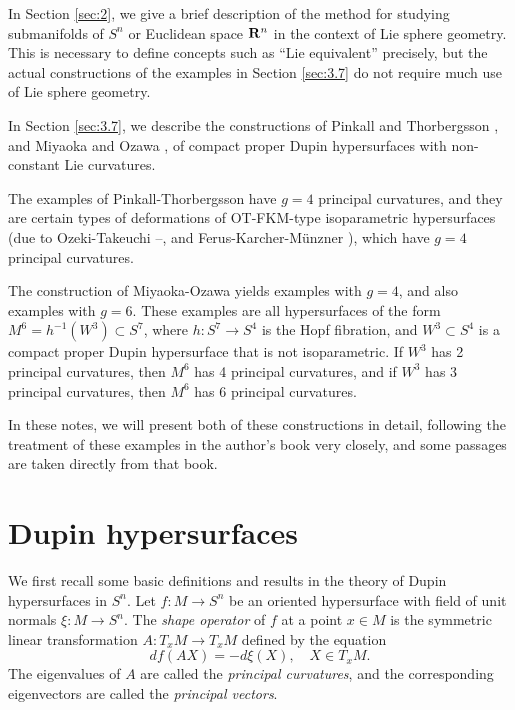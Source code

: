 \documentclass[12pt]{article}
\begin{document}
In Section \ref{sec:2}, we give a brief description of the method for studying submanifolds of $S^n$ or Euclidean space
${\bf R}^n$ in the context of Lie sphere geometry.  This is necessary to define concepts such as ``Lie equivalent'' precisely, but the actual constructions of the examples in Section \ref{sec:3.7} do not require much use of Lie sphere geometry.

In Section \ref{sec:3.7}, we describe the constructions of Pinkall and Thorbergsson \cite{PT1}, and  Miyaoka and
Ozawa \cite{MO}, of compact proper Dupin hypersurfaces with non-constant Lie curvatures.  

The examples of 
Pinkall-Thorbergsson have $g=4$ principal curvatures, and they 
are certain types of deformations of OT-FKM-type isoparametric hypersurfaces (due to Ozeki-Takeuchi 
\cite{OT}--\cite{OT2}, and
Ferus-Karcher-M\"{u}nzner  \cite{FKM}), which have $g=4$ principal curvatures.  

The construction of Miyaoka-Ozawa yields examples with $g=4$, and also examples with $g=6$.
These examples are all hypersurfaces of the form $M^6 = h^{-1}(W^3) \subset S^7$,
where $h:S^7 \rightarrow S^4$ is the Hopf fibration, and $W^3 \subset S^4$
is a compact proper Dupin hypersurface that is not isoparametric.  If $W^3$ has 2 principal curvatures, then $M^6$ has 4 principal curvatures, and if $W^3$ has 3 principal curvatures, then $M^6$ has 6 principal curvatures.


In these notes, we will present both of these constructions in detail, following the treatment of these examples in the author's book \cite[pp. 112--123]{Cec1} very closely, and some passages are taken directly from that book.


\section{Dupin hypersurfaces}
\label{sec:1}
We first recall some basic definitions and results in the theory of Dupin hypersurfaces in $S^n$.
Let $f:M \rightarrow S^n$ be an oriented hypersurface with field of unit normals $\xi:M \rightarrow S^n$.  The 
{\em shape operator}
of $f$ at a point $x \in M$ is the symmetric linear transformation $A:T_xM \rightarrow T_xM$
defined by the equation
\begin{equation}
\label{eq:3.4.1}
df(AX) = - d\xi(X), \quad X \in T_xM.
\end{equation} 
The eigenvalues of $A$ are called the 
{\em principal curvatures}, and the corresponding eigenvectors are
called the {\em principal vectors}.  
\end{document}
